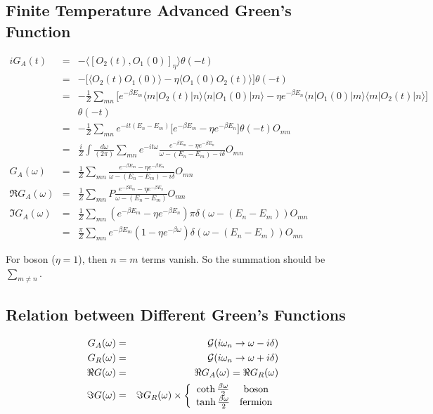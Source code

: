 \documentclass[12pt]{book}
\begin{document}
	\subsection{Finite Temperature Advanced Green's Function}
	\begin{eqnarray}
		iG_A(t)&=&-\langle [O_2(t),O_1(0)]_\eta\rangle\theta(-t)\\
		&=&-\big[\langle O_2(t)O_1(0)\rangle-\eta\langle O_1(0)O_2(t)\rangle\big]\theta(-t)\\
		&=&-\frac 1Z\sum_{mn}\big[e^{-\beta E_m}\langle m|O_2(t)|n\rangle\langle n|O_1(0)|m\rangle-\eta e^{-\beta E_n}\langle n|O_1(0)|m\rangle\langle m|O_2(t)|n\rangle\big]\nonumber\\
		&&\theta(-t)\\
		&=&-\frac 1Z\sum_{mn}e^{-it(E_n-E_m)}\big[e^{-\beta E_m}-\eta e^{-\beta E_n}\big]\theta(-t)O_{mn}\\
		&=&\frac iZ\int\frac{d\omega}{(2\pi)}\sum_{mn}e^{-it\omega}\frac{e^{-\beta E_m}-\eta e^{-\beta E_n}}{\omega-(E_n-E_m)-i\delta}O_{mn}\\
		G_A(\omega)&=&\frac 1Z\sum_{mn}\frac{e^{-\beta E_m}-\eta e^{-\beta E_n}}{\omega-(E_n-E_m)-i\delta}O_{mn}\\
		\Re G_A(\omega)&=&\frac 1Z\sum_{mn}P\frac{e^{-\beta E_m}-\eta e^{-\beta E_n}}{\omega-(E_n-E_m)}O_{mn}\\
		\Im G_A(\omega)&=&\frac 1Z\sum_{mn}(e^{-\beta E_m}-\eta e^{-\beta E_n})\pi\delta(\omega-(E_n-E_m))O_{mn}\\
		&=&\frac\pi Z\sum_{mn}e^{-\beta E_m}(1-\eta e^{-\beta\omega})\delta(\omega-(E_n-E_m))O_{mn}
	\end{eqnarray}
	
	For boson ($\eta=1$), then $n=m$ terms vanish. So the summation should be $\sum_{m\neq n}$.
	\subsection{Relation between Different Green's Functions}
	\begin{eqnarray}
		G_A(\omega)&=&\mathcal G(i\omega_n\rightarrow \omega-i\delta)\\
		G_R(\omega)&=&\mathcal G(i\omega_n\rightarrow \omega+i\delta)\\
		\Re G(\omega)&=&\Re G_A(\omega)=\Re G_R(\omega)\\
		\Im G(\omega)&=&\Im G_R(\omega)\times\left\{\begin{array}{cc}
			\coth\frac{\beta\omega}2&{\rm boson}\\
			\tanh\frac{\beta\omega}2&{\rm fermion}
		\end{array}\right.
	\end{eqnarray}
\end{document}
